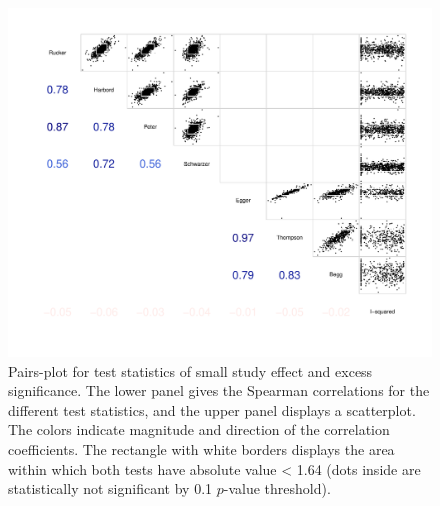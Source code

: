 \documentclass[11pt,a4paper,twoside]{book}\usepackage[]{graphicx}\usepackage[]{color}
\newenvironment{knitrout}{}{} %
\begin{document}
\begin{figure}
\begin{knitrout}
\color{fgcolor}

{\centering \includegraphics[width=\textwidth-3cm]{figure/ch03_figunnamed-chunk-12-1} 

}



\end{knitrout}
\caption{Pairs-plot for test statistics of small study effect and excess significance. The lower panel gives the Spearman correlations for the different test statistics, and the upper panel displays a scatterplot. The colors indicate magnitude and direction of the correlation coefficients. The rectangle with white borders displays the area within which both tests have absolute value < 1.64 (dots inside are statistically not significant by 0.1 $p$-value threshold).}
\label{fig:test.agreement}
\end{figure}
\end{document}

